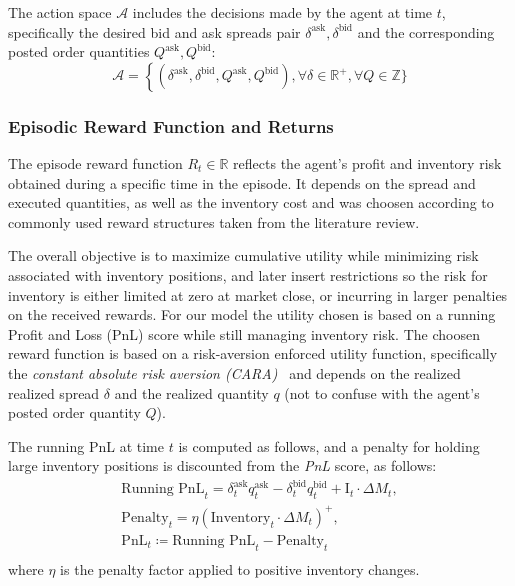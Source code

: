 The action space $\mathcal{A}$ includes the decisions made by the agent at time $t$, specifically the desired bid and ask spreads pair
$\delta^{\text{ask}}, \delta^{\text{bid}}$ and the corresponding posted order quantities $Q^{\text{ask}}, Q^{\text{bid}}$:
$$
\mathcal{A} = \left\{ (\delta^{\text{ask}}, \delta^{\text{bid}}, Q^{\text{ask}}, Q^{\text{bid}}), \forall \delta \in \mathbb{R}^+, \forall Q \in \mathbb{Z}\} \right.
$$

\subsubsection{Episodic Reward Function and Returns}

The episode reward function $R_t \in \mathbb{R}$ reflects the agent's profit and inventory risk obtained during a specific time in the episode.
It depends on the spread and executed quantities, as well as the inventory cost and was choosen according to commonly used reward structures taken from the literature review.

The overall objective is to maximize cumulative utility while minimizing risk associated with inventory positions,
and later insert restrictions so the risk for inventory is either limited at zero at market close, or incurring in larger penalties on the received rewards.
For our model the utility chosen is based on a running Profit and Loss (PnL) score while still managing inventory risk.
The choosen reward function is based on a risk-aversion enforced utility function, specifically the \textit{constant absolute risk aversion (CARA)}~\cite{Arrow1965, Pratt1964}
and depends on the realized realized spread $\delta$ and the realized quantity $q$ (not to confuse with the agent's posted order quantity $Q$).

The running PnL at time $t$ is computed as follows, and a penalty for holding large inventory positions is discounted from the \textit{PnL} score, as follows:
\begin{gather*}
    \text{Running PnL}_t = \delta_t^{\text{ask}} q_t^{\text{ask}} - \delta_t^{\text{bid}} q_t^{\text{bid}} + \text{I}_t \cdot \Delta M_t, \\
    \text{Penalty}_t = \eta \left( \text{Inventory}_t \cdot \Delta M_t \right)^+,\\
    \text{PnL}_t \coloneqq \text{Running PnL}_t - \text{Penalty}_t\\
\end{gather*}
where \( \eta \) is the penalty factor applied to positive inventory changes.

